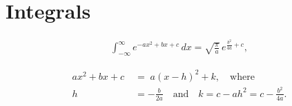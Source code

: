 \documentclass[10pt,a4paper,twocolumn]{article}
\begin{document}
\section{Integrals}

\begin{align*}
\int _{-\infty }^{\infty }e^{-ax^{2}+bx+c}\,dx={\sqrt {\frac {\pi }{a}}}\,e^{{\frac {b^{2}}{4a}}+c},
\end{align*}

\begin{align*}
ax^{2}+bx+c\;&=\;a(x-h)^{2}+k,\quad {\text{where}}\quad \\
h&=-{\frac {b}{2a}}\quad {\text{and}}\quad k=c-ah^{2}=c-{\frac {b^{2}}{4a}}.
\end{align*}
\end{document}
